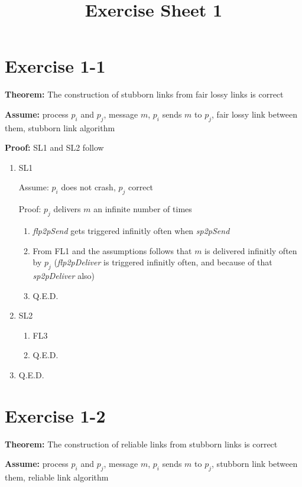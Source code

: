 \documentclass[a4paper]{article}
\title{Exercise Sheet 1}
\begin{document}
\maketitle

\section{Exercise 1-1}

\noindent 
\textbf{Theorem:} The construction of stubborn links from fair lossy links is correct

\noindent
\textbf{Assume:} process $p_i$ and $p_j$, message $m$, $p_i$ sends $m$ to $p_j$, fair lossy link between them, stubborn link algorithm

\noindent
\textbf{Proof:} SL1 and SL2 follow

\begin{enumerate}
    \item SL1

    Assume: $p_i$ does not crash, $p_j$ correct

    Proof: $p_j$ delivers $m$ an infinite number of times
    \begin{enumerate}
        \item
            \textit{flp2pSend} gets triggered infinitly often when \textit{sp2pSend}
        \item
            From FL1 and the assumptions follows that $m$ is delivered infinitly often by $p_j$ (\textit{flp2pDeliver} is triggered infinitly often, and because of that \textit{sp2pDeliver} also)
        \item
            Q.E.D.
    \end{enumerate} 
    \item SL2
        \begin{enumerate}
            \item
                FL3
            \item
                Q.E.D.
        \end{enumerate}
    \item Q.E.D.
\end{enumerate}

\section{Exercise 1-2}

\noindent 
\textbf{Theorem:} The construction of reliable links from stubborn links is correct

\noindent
\textbf{Assume:} process $p_i$ and $p_j$, message $m$, $p_i$ sends $m$ to $p_j$, stubborn link between them, reliable link algorithm
\end{document}
